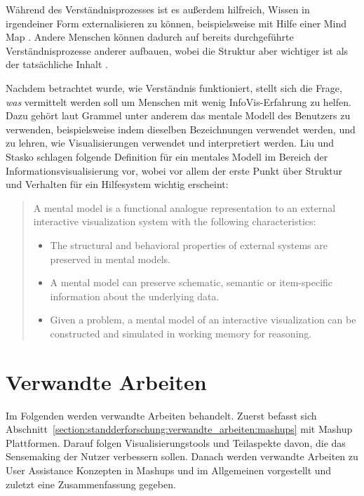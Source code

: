 \documentclass[
	headsepline,
	footsepline,
	fontsize=12pt,
	bibliography=totoc
]{scrbook}
\begin{document}

Während des Verständnisprozesses ist es außerdem hilfreich, Wissen in irgendeiner Form externalisieren zu können, beispielsweise mit Hilfe einer Mind Map \cite{Qu2005, Novak2007, Umapathy2010}. Andere Menschen können dadurch auf bereits durchgeführte Verständnisprozesse anderer aufbauen, wobei die Struktur aber wichtiger ist als der tatsächliche Inhalt \cite{Fisher2012}.

Nachdem betrachtet wurde, wie Verständnis funktioniert, stellt sich die Frage, \emph{was} vermittelt werden soll um Menschen mit wenig InfoVis-Erfahrung zu helfen. Dazu gehört laut Grammel \cite[S. 127]{Grammel2012} unter anderem das mentale Modell des Benutzers zu verwenden, beispielsweise indem dieselben Bezeichnungen verwendet werden, und zu lehren, wie Visualisierungen verwendet und interpretiert werden.  Liu und Stasko \cite{Liu2010} schlagen folgende Definition für ein mentales Modell im Bereich der Informationsvisualisierung vor, wobei vor allem der erste Punkt über Struktur und Verhalten für ein Hilfesystem wichtig erscheint:

\begin{quote}
A mental model is a functional analogue representation to an external interactive visualization system with the following characteristics:
	\begin{itemize}
		\item The structural and behavioral properties of external systems are preserved in mental models.
		\item A mental model can preserve schematic, semantic or item-specific information about the underlying data.
		\item Given a problem, a mental model of an interactive visualization can be constructed and simulated in working memory for reasoning.
	\end{itemize}
\end{quote}

\section{Verwandte Arbeiten}
\label{section:standderforschung:verwandte_arbeiten}

Im Folgenden werden verwandte Arbeiten behandelt. Zuerst befasst sich Abschnitt~\ref{section:standderforschung:verwandte_arbeiten:mashups} mit Mashup Plattformen. Darauf folgen Visualisierungstools und Teilaspekte davon, die das Sensemaking der Nutzer verbessern sollen. Danach werden verwandte Arbeiten zu User Assistance Konzepten in Mashups und im Allgemeinen vorgestellt und zuletzt eine Zusammenfassung gegeben.
\end{document}
